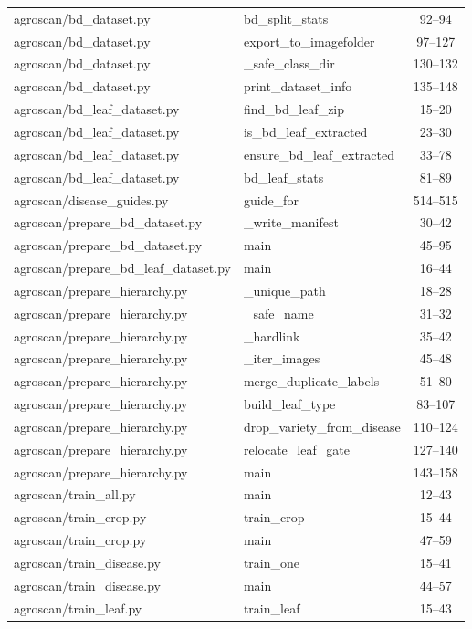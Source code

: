 \begin{center}
\begin{longtable}{@{}p{4.6cm}p{5.2cm}c@{}}
agroscan/bd\_dataset.py & bd\_split\_stats & 92--94 \\
agroscan/bd\_dataset.py & export\_to\_imagefolder & 97--127 \\
agroscan/bd\_dataset.py & \_safe\_class\_dir & 130--132 \\
agroscan/bd\_dataset.py & print\_dataset\_info & 135--148 \\
agroscan/bd\_leaf\_dataset.py & find\_bd\_leaf\_zip & 15--20 \\
agroscan/bd\_leaf\_dataset.py & is\_bd\_leaf\_extracted & 23--30 \\
agroscan/bd\_leaf\_dataset.py & ensure\_bd\_leaf\_extracted & 33--78 \\
agroscan/bd\_leaf\_dataset.py & bd\_leaf\_stats & 81--89 \\
agroscan/disease\_guides.py & guide\_for & 514--515 \\
agroscan/prepare\_bd\_dataset.py & \_write\_manifest & 30--42 \\
agroscan/prepare\_bd\_dataset.py & main & 45--95 \\
agroscan/prepare\_bd\_leaf\_dataset.py & main & 16--44 \\
agroscan/prepare\_hierarchy.py & \_unique\_path & 18--28 \\
agroscan/prepare\_hierarchy.py & \_safe\_name & 31--32 \\
agroscan/prepare\_hierarchy.py & \_hardlink & 35--42 \\
agroscan/prepare\_hierarchy.py & \_iter\_images & 45--48 \\
agroscan/prepare\_hierarchy.py & merge\_duplicate\_labels & 51--80 \\
agroscan/prepare\_hierarchy.py & build\_leaf\_type & 83--107 \\
agroscan/prepare\_hierarchy.py & drop\_variety\_from\_disease & 110--124 \\
agroscan/prepare\_hierarchy.py & relocate\_leaf\_gate & 127--140 \\
agroscan/prepare\_hierarchy.py & main & 143--158 \\
agroscan/train\_all.py & main & 12--43 \\
agroscan/train\_crop.py & train\_crop & 15--44 \\
agroscan/train\_crop.py & main & 47--59 \\
agroscan/train\_disease.py & train\_one & 15--41 \\
agroscan/train\_disease.py & main & 44--57 \\
agroscan/train\_leaf.py & train\_leaf & 15--43 \\

\end{longtable}
\end{center}
